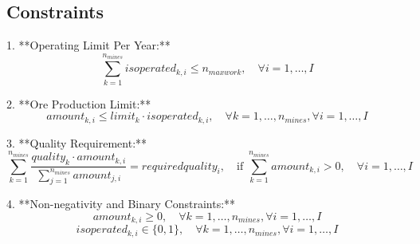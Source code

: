 \documentclass{article}
\begin{document}
\subsection*{Constraints}
1. **Operating Limit Per Year:**
\[
\sum_{k=1}^{n_{mines}} isoperated_{k,i} \leq n_{maxwork}, \quad \forall i=1,\ldots,I
\]

2. **Ore Production Limit:**
\[
amount_{k,i} \leq limit_k \cdot isoperated_{k,i}, \quad \forall k=1,\ldots,n_{mines}, \forall i=1,\ldots,I
\]

3. **Quality Requirement:**
\[
\sum_{k=1}^{n_{mines}} \frac{quality_k \cdot amount_{k,i}}{\sum_{j=1}^{n_{mines}} amount_{j,i}} = requiredquality_i , \quad \text{if } \sum_{k=1}^{n_{mines}} amount_{k,i} > 0, \quad \forall i=1,\ldots,I
\]

4. **Non-negativity and Binary Constraints:**
\[
amount_{k,i} \geq 0, \quad \forall k=1,\ldots,n_{mines}, \forall i=1,\ldots,I
\]
\[
isoperated_{k,i} \in \{0, 1\}, \quad \forall k=1,\ldots,n_{mines}, \forall i=1,\ldots,I
\]
\end{document}
